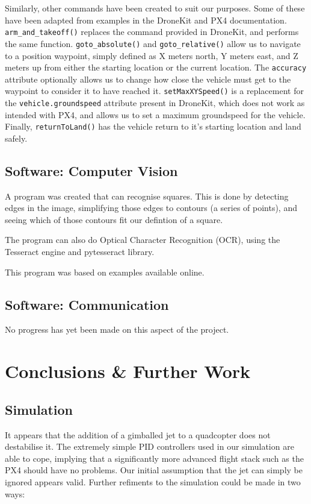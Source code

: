 \documentclass[11pt]{article}
\begin{document}
Similarly, other commands have been created to suit our purposes. Some of these have been adapted from examples in the DroneKit and PX4 documentation.\cite{dronekit}\cite{PX4_dev_guide} \lstinline|arm_and_takeoff()| replaces the command provided in DroneKit, and performs the same function. \lstinline|goto_absolute()| and \lstinline|goto_relative()| allow us to navigate to a position waypoint, simply defined as X meters north, Y meters east, and Z meters up from either the starting location or the current location. The \lstinline|accuracy| attribute optionally allows us to change how close the vehicle must get to the waypoint to consider it to have reached it. \lstinline|setMaxXYSpeed()| is a replacement for the \lstinline|vehicle.groundspeed| attribute present in DroneKit, which does not work as intended with PX4, and allows us to set a maximum groundspeed for the vehicle. Finally, \lstinline|returnToLand()| has the vehicle return to it's starting location and land safely.

\subsection{Software: Computer Vision}
A program was created that can recognise squares. This is done by detecting edges in the image, simplifying those edges to contours (a series of points), and seeing which of those contours fit our defintion of a square.

The program can also do Optical Character Recognition (OCR), using the Tesseract engine and pytesseract library.

This program was based on examples available online.\cite{opencv_tutorials}\cite{pyimagesearch_squares}\cite{pyimagesearch_ocr}

\subsection{Software: Communication}
No progress has yet been made on this aspect of the project.

\section{Conclusions \& Further Work}
\subsection{Simulation}
It appears that the addition of a gimballed jet to a quadcopter does not destabilise it. The extremely simple PID controllers used in our simulation are able to cope, implying that a significantly more advanced flight stack such as the PX4 should have no problems. Our initial assumption that the jet can simply be ignored appears valid. Further refiments to the simulation could be made in two ways:
\end{document}
